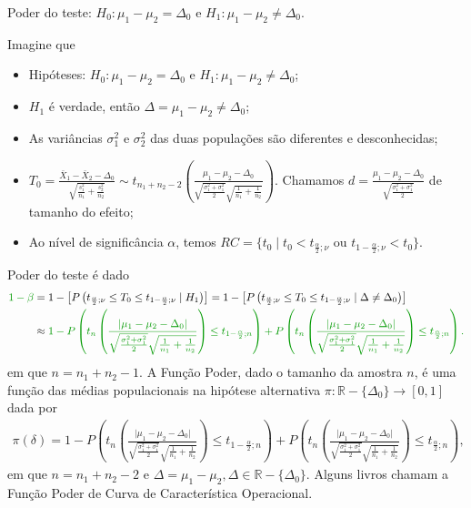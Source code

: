 \documentclass[9pt]{beamer}
\begin{document}
\begin{frame}{Poder do teste: $H_0:\mu_1 - \mu_2 = \Delta_0$ e $H_1: \mu_1 - \mu_2 \neq \Delta_0$.}

\tiny

Imagine que
\begin{itemize}
	\item Hipóteses: $H_0: \mu_1 - \mu_2 = \Delta_0$ e $H_1: \mu_1 -  \mu_2 \neq \Delta_0$;
	\item $H_1$ é verdade, então $\Delta = \mu_1-\mu_2 \neq \Delta_0$;
	\item As variâncias $\sigma_1^2$  e $\sigma_2^2$ das duas populações são diferentes e desconhecidas;
	\item $T_0 = \frac{\bar{X}_1 - \bar{X}_2 - \Delta_0}{ \sqrt{ \frac{s_1^2}{n_1} + \frac{s_2^2}{n_2} } } \sim t_{n_1+n_2-2}\left( \frac{\mu_1 - \mu_2 - \Delta_0}{\sqrt{\frac{\sigma_1^2 + \sigma_1^2}{2}} \sqrt{\frac{1}{n_1} + \frac{1}{n_2}}} \right)$. Chamamos $d = \frac{\mu_1 - \mu_2 - \Delta_0}{\sqrt{\frac{\sigma_1^2 + \sigma_1^2}{2}}}$ de tamanho do efeito;
	\item Ao nível de significância $\alpha$, temos $RC = \{ t_0 \mid t_0 < t_{\frac{\alpha}{2};\nu} \mbox{ ou } t_{1-\frac{\alpha}{2};\nu} < t_0  \}$.
\end{itemize}
\vfill	

Poder do teste é dado
\begin{align*}
\textcolor{important}{1-\beta} &=1 - \left[P\left( t_{\frac{\alpha}{2};\nu} \leq T_0 \leq t_{1-\frac{\alpha}{2};\nu} \mid H_1 \right)\right] = 1 - \left[P\left( t_{\frac{\alpha}{2};\nu} \leq T_0 \leq t_{1-\frac{\alpha}{2};\nu} \mid \Delta \neq \Delta_0 \right)\right]\\
&\approx \textcolor{important}{1 - P\left( t_{n}\left( \frac{\lvert \mu_1 - \mu_2 - \Delta_0 \rvert}{\sqrt{\frac{\sigma_1^2 + \sigma_1^2}{2}} \sqrt{\frac{1}{n_1} + \frac{1}{n_2}}} \right) \leq t_{1-\frac{\alpha}{2};n} \right)+P\left( t_{n}\left( \frac{\lvert \mu_1 - \mu_2 - \Delta_0 \rvert}{\sqrt{\frac{\sigma_1^2 + \sigma_1^2}{2}} \sqrt{\frac{1}{n_1} + \frac{1}{n_2}}} \right) \leq t_{\frac{\alpha}{2};n} \right).}
\end{align*}
em que $n = n_1 + n_2 - 1$. A \textcolor{important}{Função Poder}, dado o tamanho da amostra $n$, é uma função das médias populacionais na hipótese alternativa  $\pi: \mathbb{R} - \{\Delta_0\} \longrightarrow [0,1]$ dada por
\begin{align*}
\pi(\delta) = 1 - P\left( t_{n}\left( \frac{\lvert \mu_1 - \mu_2 - \Delta_0 \rvert}{\sqrt{\frac{\sigma_1^2 + \sigma_1^2}{2}} \sqrt{\frac{1}{n_1} + \frac{1}{n_2}}} \right) \leq t_{1-\frac{\alpha}{2};n} \right)+P\left( t_{n}\left( \frac{\lvert \mu_1 - \mu_2 - \Delta_0 \rvert}{\sqrt{\frac{\sigma_1^2 + \sigma_1^2}{2}} \sqrt{\frac{1}{n_1} + \frac{1}{n_2}}} \right) \leq t_{\frac{\alpha}{2};n} \right),
\end{align*}
em que $n=n_1+n_2-2$ e $\Delta = \mu_1 - \mu_2, \Delta \in \mathbb{R} - \{\Delta_0 \}$. Alguns livros chamam a Função Poder de \textcolor{important}{Curva de Característica Operacional.}

\normalsize

\end{frame}
\end{document}
